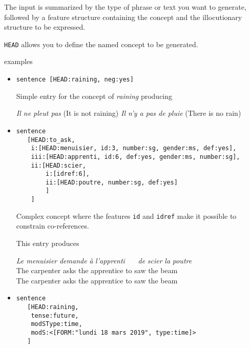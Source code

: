\documentclass[11pt]{article}
\begin{document}
The input is summarized by the type of phrase or text you want to generate, followed by a
feature structure containing the concept and the illocutionary structure to be expressed.


\texttt{HEAD} allows you to define the named concept to be generated.

examples

\begin{itemize}
\item 
\begin{verbatim}
sentence [HEAD:raining, neg:yes]
\end{verbatim}

Simple entry for the concept of \textit{raining} producing 
\begin{exe}
\ex \begin{xlist} 
\ex \textit{Il ne pleut pas} (It is not raining)
\ex \textit{Il n'y a pas de pluie} (There is no rain)
\end{xlist}
\end{exe}


\item 
\begin{verbatim}
sentence 
   [HEAD:to_ask,
    i:[HEAD:menuisier, id:3, number:sg, gender:ms, def:yes],
    iii:[HEAD:apprenti, id:6, def:yes, gender:ms, number:sg],
    ii:[HEAD:scier,
        i:[idref:6],
        ii:[HEAD:poutre, number:sg, def:yes]
        ]
    ]
\end{verbatim}

Complex concept where the features \texttt{id} and \texttt{idref}
make it possible to constrain co-references. 

This entry produces 
\begin{exe}
\ex 
\begin{tabbing}
\textit{Le menuisier} \= \textit{demande} \= \textit{à} \textit{l'apprenti}~~~ \= \textit{de} \textit{scier} \= \textit{la} \textit{poutre}\\
The carpenter \> asks \> the apprentice \> to saw \> the beam\\
The carpenter asks the apprentice to saw the
beam
\end{tabbing}
\end{exe}

\item 
\begin{verbatim}
sentence 
   [HEAD:raining, 
    tense:future, 
    modSType:time, 
    modS:<[FORM:"lundi 18 mars 2019", type:time]>
   ]
\end{verbatim}


\end{itemize}
\end{document}
